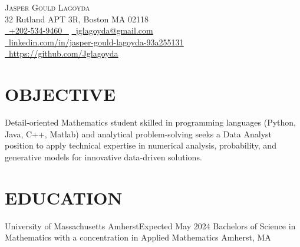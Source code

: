 \documentclass[letterpaper,11pt]{article}
\begin{document}


\begin{center}
     {\Huge \scshape Jasper Gould Lagoyda} \\ \vspace{1pt}
    32 Rutland  APT 3R, Boston MA 02118 \\ \vspace{1pt}
    \small \href{tel:+xxxxxxxxxxxx}{ \raisebox{-0.1\height}\faPhone\ \underline{+202-534-9460} ~} \href{mailto:yourname@gmail.com}{\raisebox{-0.2\height}\faEnvelope\   \underline{jglagoyda@gmail.com}} ~ \\ 
    \href{linkedin.com/in/jasper-gould-lagoyda-93a255131}{\raisebox{-0.2\height}\faLinkedinSquare\ \underline{linkedin.com/in/jasper-gould-lagoyda-93a255131}}  ~
    \href{https://github.com/Jglagoyda}{\raisebox{-0.2\height}\faGithub\ \underline{https://github.com/Jglagoyda}} ~
    \vspace{-8pt}
\end{center}
\section{OBJECTIVE}
Detail-oriented Mathematics student skilled in programming languages (Python, Java, C++, Matlab) and analytical problem-solving seeks a Data Analyst position to apply technical expertise in numerical analysis, probability, and generative models for innovative data-driven solutions.
\section{EDUCATION}
\resumeSubHeadingListStart
    \resumeSubheading
      {University of Massachusetts Amherst}{Expected May 2024}
      { Bachelors of Science in Mathematics with a concentration in Applied Mathematics 
      } {Amherst, MA} 
  \resumeSubHeadingListEnd
  
 

\end{document}
